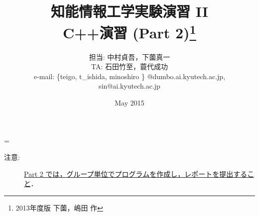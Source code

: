 %
%
\setlength{\topmargin}{-1cm}
\setlength{\oddsidemargin}{0cm}
\setlength{\textwidth}{16cm}
\setlength{\textheight}{24cm}
\renewcommand{\@}[1]{{\bf #1}}

\title{{\normalsize 知能情報工学実験演習 II }\\
\bf C++演習 (Part 2)\footnote{2013年度版 下薗，嶋田 作} }
\author{担当: 中村貞吾，下薗真一\\
TA: 石田竹至，蓑代成功\\
\small
e-mail: 
{\sf \{teigo,  t\_ishida, minoshiro \} @dumbo.ai.kyutech.ac.jp},\\
\small
{\sf sin@ai.kyutech.ac.jp}
}
\date{May 2015}
%
%
\def\linesparpage#1{\baselineskip=\textheight\divide\baselineskip#1}
\newtheorem{exerc}{演習}
\newtheorem{adv}{発展課題}
\setcounter{pntnumber}{0}
\newcommand{\POINT}[2]{
 \medskip
 \refstepcounter{pntnumber}
\noindent
■■■■■ {\sf Point \arabic{pntnumber}:} {\bf #1} \hrulefill ■ \\
{\small #2}

\noindent
■ \hrulefill ■■■■■ \\
 \medskip
}

%
%

\linesparpage{36}
\maketitle

\medskip

\begin{description}
\item[注意:] \underline{Part 2 では，グループ単位でプログラムを作成し，レポートを提出すること}．
\end{description}

